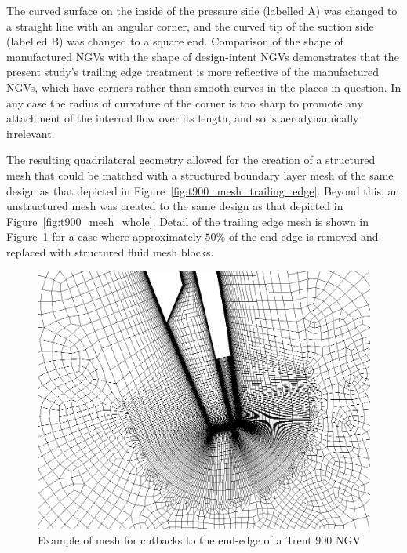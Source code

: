\documentclass[a4paper, 11pt, oneside]{report}
\begin{document}
The curved surface on the inside of the pressure side (labelled A) was changed to a straight line with an angular corner, and the curved tip of the suction side (labelled B) was changed to a square end. Comparison of the shape of manufactured NGVs with the shape of design-intent NGVs demonstrates that the present study's trailing edge treatment is more reflective of the manufactured NGVs, which have corners rather than smooth curves in the places in question. In any case the radius of curvature of the corner is too sharp to promote any attachment of the internal flow over its length, and so is aerodynamically irrelevant.

The resulting quadrilateral geometry allowed for the creation of a structured mesh that could be matched with a structured boundary layer mesh of the same design as that depicted in Figure~\ref{fig:t900_mesh_trailing_edge}. Beyond this, an unstructured mesh was created to the same design as that depicted in Figure~\ref{fig:t900_mesh_whole}. Detail of the trailing edge mesh is shown in Figure~\ref{fig:T900_ss_cutbacks_mesh} for a case where approximately $50\%$ of the end-edge is removed and replaced with structured fluid mesh blocks.

\begin{figure}[H]
      \centering
      \includegraphics[width=.9\textwidth]{figs/T900_ss_cutbacks_mesh.png}
      \caption{Example of mesh for cutbacks to the end-edge of a Trent 900 NGV}
      \label{fig:T900_ss_cutbacks_mesh}
\end{figure}
\end{document}
